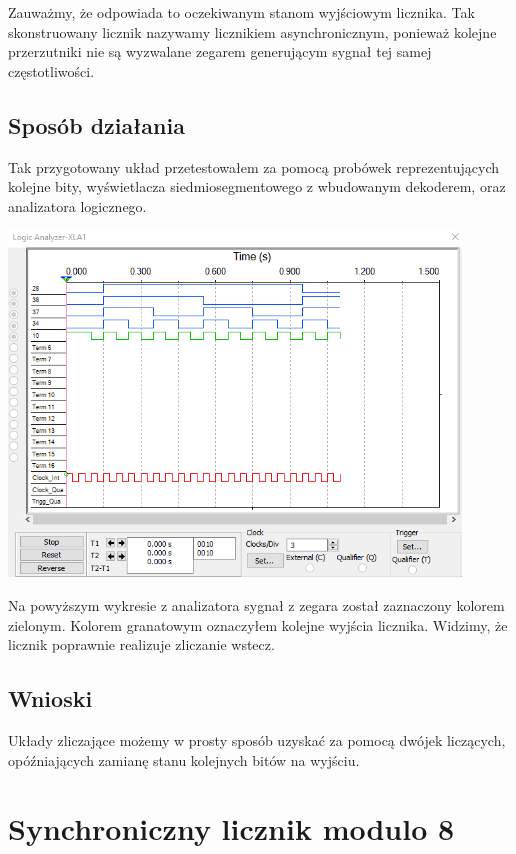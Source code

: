 \documentclass{article}
\begin{document}
            \FloatBarrier
            Zauważmy, że odpowiada to oczekiwanym stanom wyjściowym licznika. Tak skonstruowany licznik nazywamy licznikiem asynchronicznym, ponieważ kolejne przerzutniki nie są wyzwalane zegarem generującym sygnał tej samej częstotliwości. 

        
        \subsection{Sposób działania}
            Tak przygotowany układ przetestowałem za pomocą probówek reprezentujących kolejne bity, wyświetlacza siedmiosegmentowego z wbudowanym dekoderem, oraz analizatora logicznego. 
            \begin{center}
                \includegraphics[width=12cm]{reports/img/Z3B_2.png}\\
            \end{center}
            \FloatBarrier
            Na powyższym wykresie z analizatora sygnał z zegara został zaznaczony kolorem zielonym. Kolorem granatowym oznaczyłem kolejne wyjścia licznika. Widzimy, że licznik poprawnie realizuje zliczanie wstecz.
        
        \subsection{Wnioski}
            Układy zliczające możemy w prosty sposób uzyskać za pomocą dwójek liczących, opóźniających zamianę stanu kolejnych bitów na wyjściu. 
            
    \section{Synchroniczny licznik modulo 8}
\end{document}
